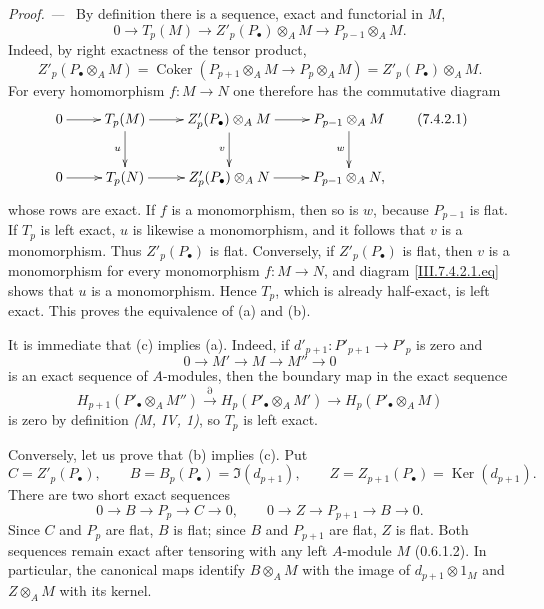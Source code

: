 \documentclass[10pt,oneside]{book}
\newcommand{\Ker}{\operatorname{Ker}}
\newcommand{\Coker}{\operatorname{Coker}}
\newcommand{\sref}[2][]{(#2)}
\newcommand{\oldpage}[2][]{\setcounter{footnote}{0}\marginpar{\scriptsize\textbf{#1}~|~#2}\ignorespaces}
\newenvironment{proof}{\par\medskip\noindent\textit{Proof. ---\ }}{\par}
\begin{document}
\begin{proof}
By definition there is a sequence, exact and functorial in
$M$,
\[
  0
  \longrightarrow
  T_p(M)
  \longrightarrow
  Z'_p(P_\bullet)\otimes_A M
  \longrightarrow
  P_{p-1}\otimes_A M.
\]
Indeed, by right exactness of the tensor product,
\[
  Z'_p(P_\bullet\otimes_A M)
  =
  \Coker(P_{p+1}\otimes_A M\longrightarrow
         P_p\otimes_A M)
  =
  Z'_p(P_\bullet)\otimes_A M.
\]
For every homomorphism $f:M\to N$ one therefore has the
commutative diagram
\[
\xymatrix{
  0 \ar[r]
    & T_p(M) \ar[r] \ar[d]_{u}
    & Z'_p(P_\bullet)\otimes_A M \ar[r] \ar[d]_{v}
    & P_{p-1}\otimes_A M \ar[d]_{w} \\
  0 \ar[r]
    & T_p(N) \ar[r]
    & Z'_p(P_\bullet)\otimes_A N \ar[r]
    & P_{p-1}\otimes_A N,
}
\tag{7.4.2.1}\label{III.7.4.2.1.eq}
\]
whose rows are exact.  If $f$ is a monomorphism, then so is
$w$, because $P_{p-1}$ is flat.  If $T_p$ is left exact,
$u$ is likewise a monomorphism, and it follows that $v$ is a
monomorphism.  Thus $Z'_p(P_\bullet)$ is flat.  Conversely, if
$Z'_p(P_\bullet)$ is flat, then $v$ is a monomorphism for every
monomorphism $f:M\to N$, and diagram
\eqref{III.7.4.2.1.eq} shows that $u$ is a monomorphism.
Hence $T_p$, which is already half-exact, is left exact.  This
proves the equivalence of (a) and (b).

It is immediate that (c) implies (a).  Indeed, if
$d'_{p+1}:P'_{p+1}\to P'_p$ is zero and
\[
  0\longrightarrow M'\longrightarrow M\longrightarrow M''
  \longrightarrow 0
\]
is an exact sequence of $A$-modules, then the boundary map in
the exact sequence
\[
  H_{p+1}(P'_\bullet\otimes_A M'')
  \xrightarrow{\partial}
  H_p(P'_\bullet\otimes_A M')
  \longrightarrow
  H_p(P'_\bullet\otimes_A M)
\]
\oldpage[III]{187}
is zero by definition \emph{(M, IV, 1)}, so $T_p$ is left
exact.

Conversely, let us prove that (b) implies (c). Put
\[
 C=Z'_p(P_\bullet),\qquad
 B=B_p(P_\bullet)=\Im(d_{p+1}),\qquad
 Z=Z_{p+1}(P_\bullet)=\Ker(d_{p+1}).
\]
There are two short exact sequences
\[
 0\longrightarrow B\longrightarrow P_p\longrightarrow C\longrightarrow0,
 \qquad
 0\longrightarrow Z\longrightarrow P_{p+1}\longrightarrow B\longrightarrow0.
\]
Since $C$ and $P_p$ are flat, $B$ is flat; since $B$ and $P_{p+1}$
are flat, $Z$ is flat. Both sequences remain exact after tensoring with
any left $A$-module $M$ \sref[0]{0.6.1.2}. In particular, the canonical
maps identify $B\otimes_A M$ with the image of $d_{p+1}\otimes1_M$
and $Z\otimes_A M$ with its kernel.


\end{proof}
\end{document}
